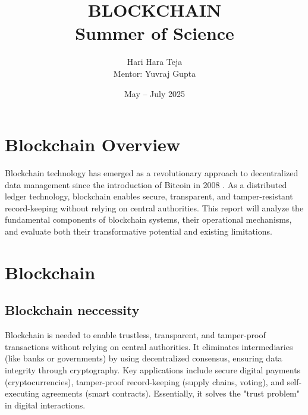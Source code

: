 \documentclass[12pt, a4paper]{article}
\begin{document}
\title{BLOCKCHAIN \\[0.5em] \large Summer of Science}
\author{Hari Hara Teja \\ Mentor: Yuvraj Gupta}
\date{May -- July 2025}

\maketitle
\tableofcontents

\newpage
\section{Blockchain Overview}
Blockchain technology has emerged as a revolutionary approach to decentralized data management since the introduction of Bitcoin in 2008 \cite{nakamoto2008bitcoin}. As a distributed ledger technology, blockchain enables secure, transparent, and tamper-resistant record-keeping without relying on central authorities. This report will analyze the fundamental components of blockchain systems, their operational mechanisms, and evaluate both their transformative potential and existing limitations.

\section{Blockchain}

\subsection{Blockchain neccessity}
Blockchain is needed to enable trustless, transparent, and tamper-proof transactions without relying on central authorities. It eliminates intermediaries (like banks or governments) by using decentralized consensus, ensuring data integrity through cryptography. Key applications include secure digital payments (cryptocurrencies), tamper-proof record-keeping (supply chains, voting), and self-executing agreements (smart contracts). Essentially, it solves the "trust problem" in digital interactions.
\end{document}
